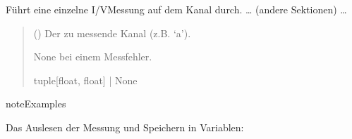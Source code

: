 \documentclass[letterpaper,10pt,english]{sphinxmanual}
\begin{document}
\begin{fulllineitems}
\begin{fulllineitems}
\begin{quote}
\begin{description}
\begin{itemize}
\end{itemize}

\end{description}\end{quote}

\end{fulllineitems}


\begin{fulllineitems}
\label{\detokenize{modulab/smu_manager:modules.smu.SmuManager.SmuManager.measure_iv}}
\pysigstartsignatures
\pysiglinewithargsret
{}
{}
{}
\pysigstopsignatures
\sphinxAtStartPar
Führt eine einzelne I/V\sphinxhyphen{}Messung auf dem Kanal durch.
… (andere Sektionen) …
\begin{quote}\begin{description}
\sphinxAtStartPar
{} () \textendash{} Der zu messende Kanal (z.B. ‘a’).

\sphinxAtStartPar
\begin{description}
\sphinxAtStartPar
None bei einem Messfehler.

\end{description}


\sphinxAtStartPar
tuple{[}float, float{]} | None

\end{description}\end{quote}

\begin{sphinxadmonition}{note}{Examples}

\sphinxAtStartPar
Das Auslesen der Messung und Speichern in Variablen:

\begin{sphinxVerbatim}[commandchars=\\\{\}]
  


\end{sphinxVerbatim}
\end{sphinxadmonition}
\end{fulllineitems}
\end{fulllineitems}
\end{document}
